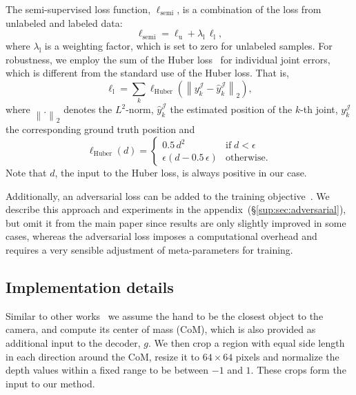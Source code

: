 \documentclass[10pt,twocolumn,letterpaper]{article}
\begin{document}
The semi-supervised loss function, $\ell_{\mathrm{semi}}$, 
is a combination of the loss from unlabeled and labeled data:
\begin{equation}
  \ell_{\mathrm{semi}} = \ell_{\mathrm{u}} + \lambda_{\mathrm{l}} \, \ell_{\mathrm{l}},
  \label{equ:loss_semi}
\end{equation}
where $\lambda_{\textrm{l}}$ is a weighting factor, which is set to zero for unlabeled samples.
For robustness, we employ the sum of the Huber loss~\cite{Huber1964annals_loss}
for individual joint errors, which is different from the standard use of the Huber loss.
That is, 
\begin{equation}
  \ell_{\mathrm{l}} = \sum_{k} \ell_{\mathrm{Huber}}
  \left( \left\| y^{\mathcal{J}}_{k} - \hat{y}^{\mathcal{J}}_{k} \right\|_{2} \right),
\end{equation}
where $\left\| . \right\|_{2}$ denotes the $L^{2}$-norm, 
$\hat{y}^{\mathcal{J}}_{k}$ the estimated position of the $k$-th joint, 
$y^{\mathcal{J}}_{k}$ the corresponding ground truth position and
\begin{equation}
 \ell_{\mathrm{Huber}} (d) = 
 \begin{cases}
  0.5 \, d^{2} 		& \textrm{if} \; d < \epsilon \\
  \epsilon \left( d - 0.5 \, \epsilon \right) 	& \textrm{otherwise}.
 \end{cases}
\end{equation}
Note that $d$, the input to the Huber loss, is always positive in our case.

Additionally, an adversarial loss can be added 
to the training objective~\cite{Goodfellow2014nips_gan,Mao2017iccv_lsgan,Mirza2014arxiv_condgan}.
We describe this approach and experiments in the appendix~(\S\ref{sup:sec:adversarial}), 
but omit it from the main paper since 
results are only slightly improved in some cases,
whereas the adversarial loss imposes a computational overhead and requires
a very sensible adjustment of meta-parameters for training.

\subsection{Implementation details}
Similar to other works~\cite{Krejov17cviu,Tang2014cvpr_lrf} 
we assume the hand to be the closest object to the camera, and 
compute its center of mass (CoM),
which is also provided as additional input to the decoder, $g$.
We then crop a region with equal side length in each direction around the CoM, 
resize it to $64 \times 64$ pixels and normalize the depth values within a fixed range
to be between $-1$ and $1$.
These crops form the input to our method.
\end{document}
